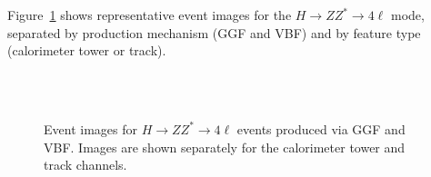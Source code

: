 \documentclass[12pt]{article}
\begin{document}
        Figure~\ref{fig:GGF_VBF_event_image} shows representative event images for the $ H\to ZZ^* \to 4\ell$ mode, separated by production mechanism (GGF and VBF) and by feature type (calorimeter tower or track). 
        \begin{figure}[htpb]
            \centering
             \\
             \\
            \caption{Event images for $H \to ZZ^* \to 4\ell$ events produced via GGF and VBF. Images are shown separately for the calorimeter tower and track channels.}
            \label{fig:GGF_VBF_event_image}
        \end{figure}
\end{document}
